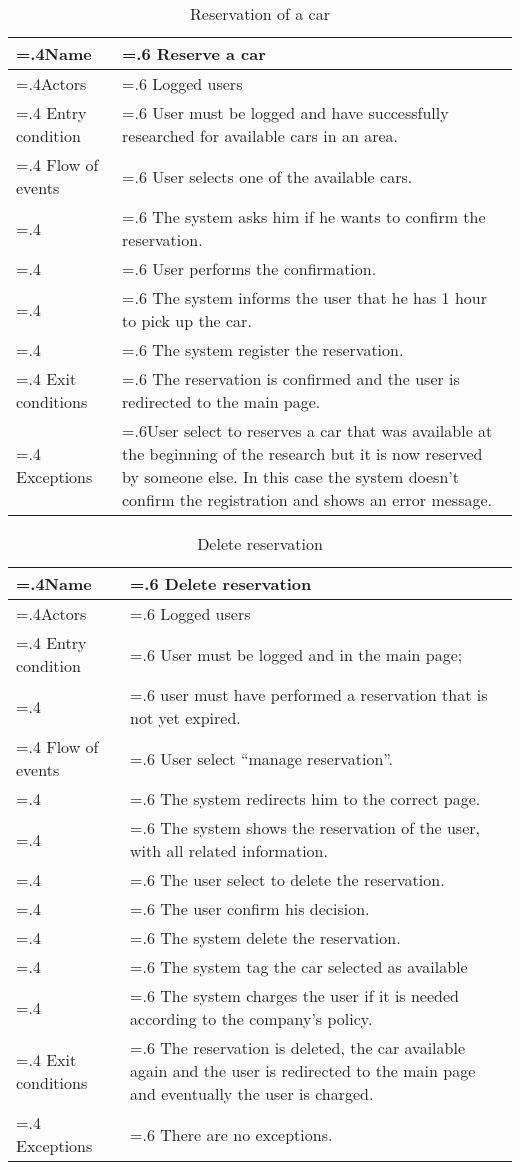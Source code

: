\documentclass[10pt, a4paper,titlepage]{article}
\begin{document}
\begin{table}[h]
\caption{Reservation of a car} \label{tab:scenario4}
\begin{tabularx}{\textwidth}{|>{\hsize=.4\hsize}X|>{\hsize=.6\hsize}X|}
\hline
Name & Reserve a car\\
\hline
Actors & Logged users \\
\hline
Entry condition &  User must be logged and have successfully researched for available cars in an area. \\
\hline
Flow of events & User selects one of the available cars.\\
& The system asks him if he wants to confirm the reservation.\\
& User performs the confirmation.\\
& The system informs the user that he has 1 hour to pick up the car.\\
& The system register the reservation.\\
\hline
Exit conditions & The reservation is confirmed and the user is redirected to the main page. \\
\hline
Exceptions &User select to reserves a car that was available at the beginning of the research but it is now reserved by someone else. In this case the system doesn't confirm the registration and shows an error message.\\
\hline
\end{tabularx}
\end{table}
\begin{table}[h]
\caption{Delete reservation} \label{tab:scenario5}
\begin{tabularx}{\textwidth}{|>{\hsize=.4\hsize}X|>{\hsize=.6\hsize}X|}
\hline
Name & Delete reservation \\
\hline
Actors & Logged users \\
\hline
Entry condition &  User must be logged and in the main page;\\
& user must have performed a reservation that is not yet expired. \\
\hline
Flow of events & User select “manage reservation”.\\
& The system redirects him to the correct page.\\
& The system shows the reservation of the user, with all related information.\\
& The user select to delete the reservation.\\
& The user confirm his decision.\\
& The system delete the reservation.\\
& The system tag the car selected as available\\
& The system charges the user if it is needed according to the company’s policy.\\
\hline
Exit conditions & The reservation is deleted, the car available again and the user is redirected to the main page and eventually the user is charged.\\
\hline
Exceptions & There are no exceptions.\\
\hline
\end{tabularx}
\end{table}
\end{document}
